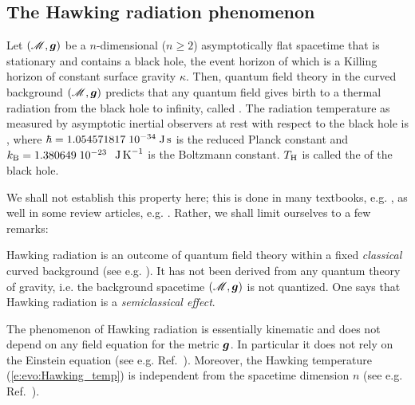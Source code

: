 \subsection{The Hawking radiation phenomenon} \label{s:evo:Hawking_rad}

\begin{prop}
Let $(\mathscr{M},\bm{g})$ be a $n$-dimensional ($n\geq 2$) asymptotically flat
spacetime that is stationary and contains a black hole, the event horizon
of which is a Killing horizon of constant surface gravity $\kappa$.
Then, quantum field theory in the curved background $(\mathscr{M},\bm{g})$
predicts that any quantum field gives birth to a thermal radiation
from the black hole to infinity, called
. The radiation temperature
as measured by asymptotic inertial observers at rest with respect to the black hole
is
\be \label{e:evo:Hawking_temp}
     ,
\ee
where $\hbar = 1.054571817\; 10^{-34} {\rm\; J\, s}$ is the reduced Planck constant and
$k_{\rm B} = 1.380649\; 10^{-23}$ ${\rm\;  J\, K}^{-1}$ is the Boltzmann constant. $T_{\rm H}$ is called the
 of the black hole.
\end{prop}

We shall not establish this property here; this is done in many textbooks,
e.g. \cite{Wald84,Wald94,FroloN98,Carro04,FabbrN05}, as well in some review
articles, e.g. \cite{BroutMPS95,Damou04,Jacob96}. Rather, we shall limit
ourselves to a few remarks:


\begin{remark}
Hawking radiation is an outcome of quantum field theory within a fixed \emph{classical} curved background
(see e.g. \cite{Wald94}). It has not been derived from any quantum theory of gravity, i.e. the background spacetime $(\mathscr{M},\bm{g})$ is not quantized. One says that Hawking radiation is
a \emph{semiclassical effect}.
\end{remark}

\begin{remark} \label{r:evo:Hawking_rad_kinematic}
The phenomenon of Hawking radiation is essentially kinematic and does not depend on any field equation for the
metric $\bm{g}$. In particular it does not rely on the Einstein equation
(see e.g. Ref.~\cite{Visse98}).
Moreover, the Hawking temperature (\ref{e:evo:Hawking_temp}) is independent from the spacetime dimension
$n$ (see e.g. Ref.~\cite{KantiW15}).
\end{remark}

